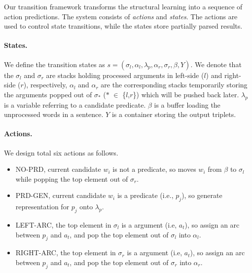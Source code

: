\documentclass[letterpaper]{article} %
\begin{document}
\begin{CJK}{UTF8}{gbsn}
Our transition framework transforms the structural learning into a sequence of action predictions.
The system consists of \emph{actions} and \emph{states}.
The actions are used to control state transitions, while the states store partially parsed results.


\paragraph{States.}
We define the transition states as $s = (\sigma_l, \alpha_l, \lambda_p, \alpha_r, \sigma_r, \beta, Y)$.
We denote that the $\sigma_l$ and $\sigma_r$ are stacks holding processed arguments in left-side ($l$) and right-side ($r$), respectively,
$\alpha_l$ and $\alpha_r$ are the corresponding stacks temporarily storing the arguments popped out of $\sigma_*$ ($*$ $\in$ \{$l$,$r$\}) which will be pushed back later.
$\lambda_p$ is a variable referring to a candidate predicate.
$\beta$ is a buffer loading the unprocessed words in a sentence.
$Y$ is a container storing the output triplets.


\paragraph{Actions.}

We design total six actions as follows.
\begin{itemize}
\setlength{\topsep}{0pt}
\setlength{\itemsep}{0pt}
\setlength{\parsep}{0pt}
\setlength{\parskip}{0pt}
    \item NO-PRD, current candidate $w_i$ is not a predicate, so moves $w_i$ from $\beta$ to $\sigma_l$ while popping the top element out of $\sigma_r$.


    \item PRD-GEN, current candidate $w_i$ is a predicate (i.e., $p_j$), so generate representation for $p_j$ onto $\lambda_p$.


    \item LEFT-ARC, the top element in $\sigma_l$ is a argument (i.e, $a_t$), so assign an arc between $p_j$ and $a_t$, and pop the top element out of $\sigma_l$ into $\alpha_l$.

    \item RIGHT-ARC, the top element in $\sigma_r$ is a argument (i.e, $a_t$), so assign an arc between $p_j$ and $a_t$, and pop the top element out of $\sigma_r$ into $\alpha_r$.



\end{itemize}
\end{CJK}
\end{document}
